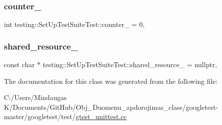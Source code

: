 \subsubsection{\texorpdfstring{counter\_}{counter\_}}
{\footnotesize\ttfamily int testing\+::\+Set\+Up\+Test\+Suite\+Test\+::counter\+\_\+ = 0\hspace{0.3cm}{\ttfamily [static]}, {\ttfamily [protected]}}

\mbox{\label{classtesting_1_1_set_up_test_suite_test_a91d5526233a6cbbe776cdfe80f39492a}} 
\subsubsection{\texorpdfstring{shared\_resource\_}{shared\_resource\_}}
{\footnotesize\ttfamily const char $\ast$ testing\+::\+Set\+Up\+Test\+Suite\+Test\+::shared\+\_\+resource\+\_\+ = nullptr\hspace{0.3cm}{\ttfamily [static]}, {\ttfamily [protected]}}



The documentation for this class was generated from the following file\+:\begin{DoxyCompactItemize}
\item 
C\+:/\+Users/\+Mindaugas K/\+Documents/\+Git\+Hub/\+Obj\+\_\+\+Duomenu\+\_\+apdorojimas\+\_\+class/googletest-\/master/googletest/test/\mbox{\hyperlink{googletest-master_2googletest_2test_2gtest__unittest_8cc}{gtest\+\_\+unittest.\+cc}}\end{DoxyCompactItemize}
